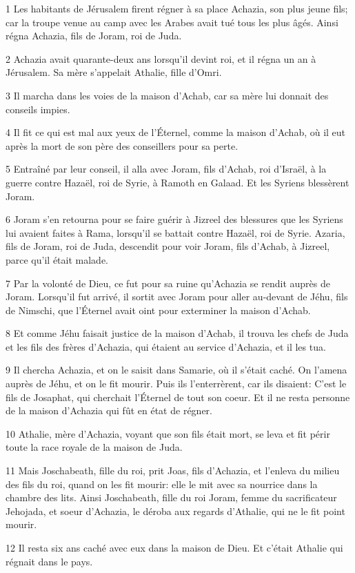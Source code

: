 \par 1 Les habitants de Jérusalem firent régner à sa place Achazia, son plus jeune fils; car la troupe venue au camp avec les Arabes avait tué tous les plus âgés. Ainsi régna Achazia, fils de Joram, roi de Juda.
\par 2 Achazia avait quarante-deux ans lorsqu'il devint roi, et il régna un an à Jérusalem. Sa mère s'appelait Athalie, fille d'Omri.
\par 3 Il marcha dans les voies de la maison d'Achab, car sa mère lui donnait des conseils impies.
\par 4 Il fit ce qui est mal aux yeux de l'Éternel, comme la maison d'Achab, où il eut après la mort de son père des conseillers pour sa perte.
\par 5 Entraîné par leur conseil, il alla avec Joram, fils d'Achab, roi d'Israël, à la guerre contre Hazaël, roi de Syrie, à Ramoth en Galaad. Et les Syriens blessèrent Joram.
\par 6 Joram s'en retourna pour se faire guérir à Jizreel des blessures que les Syriens lui avaient faites à Rama, lorsqu'il se battait contre Hazaël, roi de Syrie. Azaria, fils de Joram, roi de Juda, descendit pour voir Joram, fils d'Achab, à Jizreel, parce qu'il était malade.
\par 7 Par la volonté de Dieu, ce fut pour sa ruine qu'Achazia se rendit auprès de Joram. Lorsqu'il fut arrivé, il sortit avec Joram pour aller au-devant de Jéhu, fils de Nimschi, que l'Éternel avait oint pour exterminer la maison d'Achab.
\par 8 Et comme Jéhu faisait justice de la maison d'Achab, il trouva les chefs de Juda et les fils des frères d'Achazia, qui étaient au service d'Achazia, et il les tua.
\par 9 Il chercha Achazia, et on le saisit dans Samarie, où il s'était caché. On l'amena auprès de Jéhu, et on le fit mourir. Puis ils l'enterrèrent, car ils disaient: C'est le fils de Josaphat, qui cherchait l'Éternel de tout son coeur. Et il ne resta personne de la maison d'Achazia qui fût en état de régner.
\par 10 Athalie, mère d'Achazia, voyant que son fils était mort, se leva et fit périr toute la race royale de la maison de Juda.
\par 11 Mais Joschabeath, fille du roi, prit Joas, fils d'Achazia, et l'enleva du milieu des fils du roi, quand on les fit mourir: elle le mit avec sa nourrice dans la chambre des lits. Ainsi Joschabeath, fille du roi Joram, femme du sacrificateur Jehojada, et soeur d'Achazia, le déroba aux regards d'Athalie, qui ne le fit point mourir.
\par 12 Il resta six ans caché avec eux dans la maison de Dieu. Et c'était Athalie qui régnait dans le pays.

